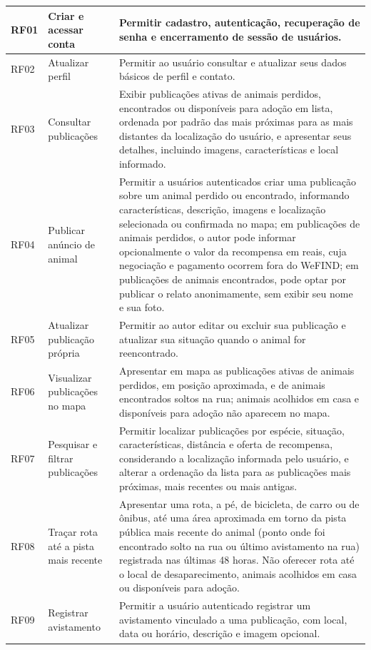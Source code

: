 {\begin{longtable}{|>{\centering\arraybackslash}p{1.3cm}|>{\raggedright\arraybackslash}p{4.2cm}|>{\raggedright\arraybackslash}p{8.8cm}|}
RF01 & Criar e acessar conta & Permitir cadastro, autenticação, recuperação de senha e encerramento de sessão de usuários. \\ \hline
RF02 & Atualizar perfil & Permitir ao usuário consultar e atualizar seus dados básicos de perfil e contato. \\ \hline
RF03 & Consultar publicações & Exibir publicações ativas de animais perdidos, encontrados ou disponíveis para adoção em lista, ordenada por padrão das mais próximas para as mais distantes da localização do usuário, e apresentar seus detalhes, incluindo imagens, características e local informado. \\ \hline
RF04 & Publicar anúncio de animal & Permitir a usuários autenticados criar uma publicação sobre um animal perdido ou encontrado, informando características, descrição, imagens e localização selecionada ou confirmada no mapa; em publicações de animais perdidos, o autor pode informar opcionalmente o valor da recompensa em reais, cuja negociação e pagamento ocorrem fora do WeFIND; em publicações de animais encontrados, pode optar por publicar o relato anonimamente, sem exibir seu nome e sua foto. \\ \hline
RF05 & Atualizar publicação própria & Permitir ao autor editar ou excluir sua publicação e atualizar sua situação quando o animal for reencontrado. \\ \hline
RF06 & Visualizar publicações no mapa & Apresentar em mapa as publicações ativas de animais perdidos, em posição aproximada, e de animais encontrados soltos na rua; animais acolhidos em casa e disponíveis para adoção não aparecem no mapa. \\ \hline
RF07 & Pesquisar e filtrar publicações & Permitir localizar publicações por espécie, situação, características, distância e oferta de recompensa, considerando a localização informada pelo usuário, e alterar a ordenação da lista para as publicações mais próximas, mais recentes ou mais antigas. \\ \hline
RF08 & Traçar rota até a pista mais recente & Apresentar uma rota, a pé, de bicicleta, de carro ou de ônibus, até uma área aproximada em torno da pista pública mais recente do animal (ponto onde foi encontrado solto na rua ou último avistamento na rua) registrada nas últimas 48 horas. Não oferecer rota até o local de desaparecimento, animais acolhidos em casa ou disponíveis para adoção. \\ \hline
RF09 & Registrar avistamento & Permitir a usuário autenticado registrar um avistamento vinculado a uma publicação, com local, data ou horário, descrição e imagem opcional. \\ \hline

\end{longtable}}
